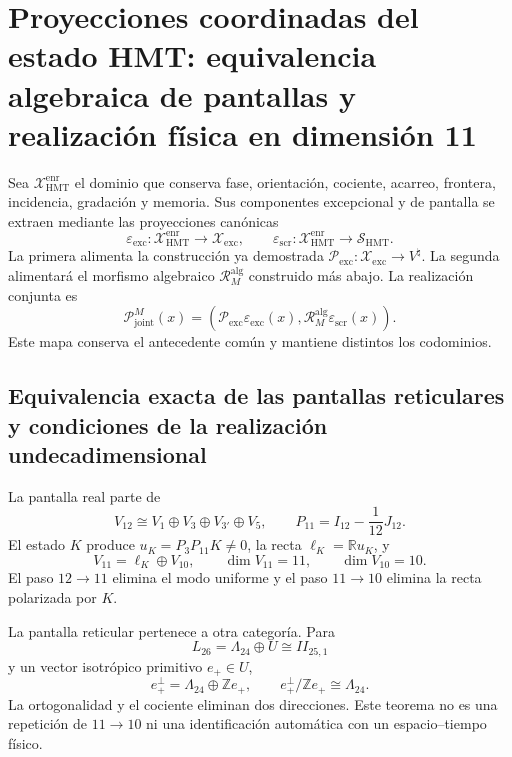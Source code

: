 \section{Proyecciones coordinadas del estado HMT: equivalencia algebraica de pantallas y realización física en dimensión 11}
\label{sec:cierre-equivalencias-moonshine-teoria-m-20260825}

Sea \(\mathcal X_{\mathrm{HMT}}^{\mathrm{enr}}\) el dominio que conserva
fase, orientación, cociente, acarreo, frontera, incidencia, gradación y
memoria. Sus componentes excepcional y de pantalla se extraen mediante las
proyecciones canónicas
\[
 \varepsilon_{\mathrm{exc}}:
 \mathcal X_{\mathrm{HMT}}^{\mathrm{enr}}
 \longrightarrow\mathscr X_{\mathrm{exc}},
 \qquad
 \varepsilon_{\mathrm{scr}}:
 \mathcal X_{\mathrm{HMT}}^{\mathrm{enr}}
 \longrightarrow\mathscr S_{\mathrm{HMT}}.
\]
La primera alimenta la construcción ya demostrada
\(\mathcal P_{\mathrm{exc}}:\mathscr X_{\mathrm{exc}}\to V^\natural\).
La segunda alimentará el morfismo algebraico
\(\mathcal R_M^{\mathrm{alg}}\) construido más abajo. La realización conjunta
es
\[
 \mathcal P_{\mathrm{joint}}^M(x)
 =\left(
   \mathcal P_{\mathrm{exc}}\varepsilon_{\mathrm{exc}}(x),
   \mathcal R_M^{\mathrm{alg}}\varepsilon_{\mathrm{scr}}(x)
  \right).
\]
Este mapa conserva el antecedente común y mantiene distintos los codominios.

\subsection{Equivalencia exacta de las pantallas reticulares y condiciones de la realización undecadimensional}

La pantalla real parte de
\[
 V_{12}\cong V_1\oplus V_3\oplus V_{3'}\oplus V_5,
 \qquad
 P_{11}=I_{12}-\frac1{12}J_{12}.
\]
El estado \(K\) produce \(u_K=P_3P_{11}K\ne0\), la recta
\(\ell_K=\mathbb Ru_K\), y
\[
 V_{11}=\ell_K\oplus V_{10},
 \qquad \dim V_{11}=11,
 \qquad \dim V_{10}=10.
\]
El paso \(12\to11\) elimina el modo uniforme y el paso \(11\to10\) elimina
la recta polarizada por \(K\).

La pantalla reticular pertenece a otra categoría. Para
\[
 L_{26}=\Lambda_{24}\oplus U\cong II_{25,1}
\]
y un vector isotrópico primitivo \(e_+\in U\),
\[
 e_+^\perp=\Lambda_{24}\oplus\mathbb Ze_+,
 \qquad
 \boxed{e_+^\perp/\mathbb Ze_+\cong\Lambda_{24}.}
\]
La ortogonalidad y el cociente eliminan dos direcciones. Este teorema no es
una repetición de \(11\to10\) ni una identificación automática con un
espacio--tiempo físico.

